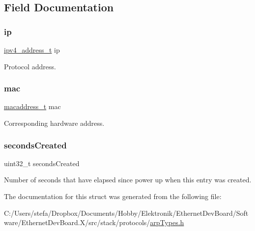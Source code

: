 \subsection{Field Documentation}
\mbox{\label{struct_a_r_p__table_entry_a8788f788aa5f4c53d49e312f6589769a}} 
\subsubsection{\texorpdfstring{ip}{ip}}
{\footnotesize\ttfamily \mbox{\hyperlink{group__ipv4_gad9df0882950e70d0587a4b423beb261a}{ipv4\+\_\+address\+\_\+t}} ip}



Protocol address. 

\mbox{\label{struct_a_r_p__table_entry_a815eb066061f1dd9afdb6c6eee48f46e}} 
\subsubsection{\texorpdfstring{mac}{mac}}
{\footnotesize\ttfamily \mbox{\hyperlink{group__ethernet_gacb865bcbf50a6c8cef05581bfabff373}{macaddress\+\_\+t}} mac}



Corresponding hardware address. 

\mbox{\label{struct_a_r_p__table_entry_a06c3d88e59b26905ae3d434ff0b6e23e}} 
\subsubsection{\texorpdfstring{secondsCreated}{secondsCreated}}
{\footnotesize\ttfamily uint32\+\_\+t seconds\+Created}



Number of seconds that have elapsed since power up when this entry was created. 



The documentation for this struct was generated from the following file\+:\begin{DoxyCompactItemize}
\item 
C\+:/\+Users/stefa/\+Dropbox/\+Documents/\+Hobby/\+Elektronik/\+Ethernet\+Dev\+Board/\+Software/\+Ethernet\+Dev\+Board.\+X/src/stack/protocols/\mbox{\hyperlink{arp_types_8h}{arp\+Types.\+h}}\end{DoxyCompactItemize}
